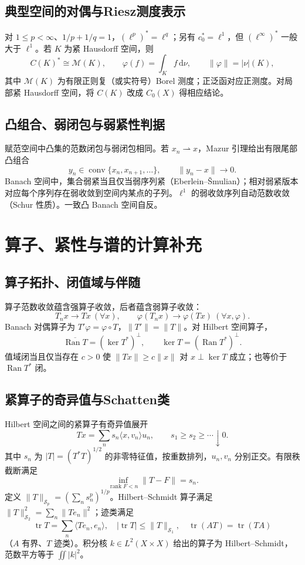 \documentclass[../main.tex]{subfiles}
\begin{document}
\subsection{典型空间的对偶与Riesz测度表示}
对 $1\le p<\infty$、$1/p+1/q=1$，$ (\ell^p)^*=\ell^q$；另有 $c_0^*=\ell^1$，但 $(\ell^\infty)^*$ 一般大于 $\ell^1$。若 $K$ 为紧 Hausdorff 空间，则
\[
C(K)^*\cong\mathcal M(K),\qquad
\varphi(f)=\int_K f\,\mathrm d\nu,\qquad \|\varphi\|=|\nu|(K),
\]
其中 $\mathcal M(K)$ 为有限正则复（或实符号）Borel 测度；正泛函对应正测度。对局部紧 Hausdorff 空间，将 $C(K)$ 改成 $C_0(X)$ 得相应结论。
\subsection{凸组合、弱闭包与弱紧性判据}
赋范空间中凸集的范数闭包与弱闭包相同。若 $x_n\rightharpoonup x$，Mazur 引理给出有限尾部凸组合
\[
y_n\in\operatorname{conv}\{x_n,x_{n+1},\ldots\},\qquad\|y_n-x\|\to0.
\]
Banach 空间中，集合弱紧当且仅当弱序列紧（Eberlein--Šmulian）；相对弱紧版本对应每个序列存在弱收敛到空间内某点的子列。$\ell^1$ 的弱收敛序列自动范数收敛（Schur 性质）。一致凸 Banach 空间自反。
\section{算子、紧性与谱的计算补充}
\subsection{算子拓扑、闭值域与伴随}
算子范数收敛蕴含强算子收敛，后者蕴含弱算子收敛：
\[
T_nx\to Tx\ (\forall x),\qquad
\varphi(T_nx)\to\varphi(Tx)\ (\forall x,\varphi).
\]
Banach 对偶算子为 $T'\varphi=\varphi\circ T$，$\|T'\|=\|T\|$。对 Hilbert 空间算子，
\[
\overline{\operatorname{Ran}T}=(\ker T^*)^\perp,\qquad
\ker T=(\operatorname{Ran}T^*)^\perp.
\]
值域闭当且仅当存在 $c>0$ 使 $\|Tx\|\ge c\|x\|$ 对 $x\perp\ker T$ 成立；也等价于 $\operatorname{Ran}T^*$ 闭。
\subsection{紧算子的奇异值与Schatten类}
Hilbert 空间之间的紧算子有奇异值展开
\[
Tx=\sum_{n}s_n\langle x,v_n\rangle u_n,\qquad s_1\ge s_2\ge\cdots\downarrow0.
\]
其中 $s_n$ 为 $|T|=(T^*T)^{1/2}$ 的非零特征值，按重数排列，$u_n,v_n$ 分别正交。有限秩截断满足
\[
\inf_{\operatorname{rank}F<n}\|T-F\|=s_n.
\]
定义 $\|T\|_{\mathcal S_p}=(\sum_ns_n^p)^{1/p}$。Hilbert--Schmidt 算子满足 $\|T\|_{\mathcal S_2}^2=\sum_n\|Te_n\|^2$；迹类满足
\[
\operatorname{tr}T=\sum_n\langle Te_n,e_n\rangle,\quad
|\operatorname{tr}T|\le\|T\|_{\mathcal S_1},\quad
\operatorname{tr}(AT)=\operatorname{tr}(TA)
\]
（$A$ 有界、$T$ 迹类）。积分核 $k\in L^2(X\times X)$ 给出的算子为 Hilbert--Schmidt，范数平方等于 $\iint|k|^2$。
\end{document}
